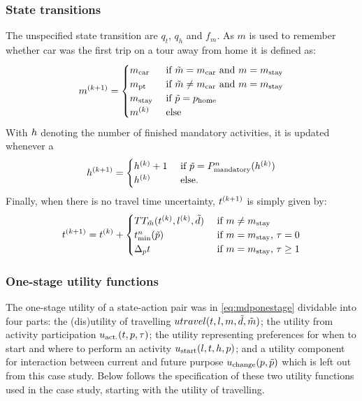 \subsubsection{State transitions}
The unspecified state transition are $q_t$, $q_h$ and $f_m$. As $m$ is used to remember whether car was the first trip on a tour away from home it is defined as:
\begin{equation}
    m\ks{k+1} = 
    \begin{cases}
        \m{car} & \cif \act{m} = \m{car} \text{ and } m=m_\text{stay} \\
        \m{pt}  & \cif \act{m} \neq \m{car} \text{ and } m=m_\text{stay}  \\
        m_\text{stay} & \cif \act{p} = p_{\text{home}} \\
		m\ks{k} & \celse
    \end{cases}
\end{equation}
With $h$ denoting the number of finished mandatory activities, it is updated whenever a 
\begin{equation}
	\amem\ks{k+1} = 
	\begin{cases}
		\amem\ks{k}+1 &\cif \act{p} = P^n_{\text{mandatory}}(\amem\ks{k}) \\
		\amem\ks{k}& \celse.
	\end{cases}
\end{equation}
Finally, when there is no travel time uncertainty, $t^{(k+1)}$ is simply given by:
\begin{equation}
	t\ks{k+1} =t\ks{k} + \begin{cases}
  	\TT_{\act{m}}(t\ks{k},l\ks{k},\act{d}) & \cif m\neq m_\text{stay} \\
  	t_{\text{min}}^n(\act{p}) & \cif m= m_\text{stay} \text{, } \atime = 0  \\
  	\Delta_p t & \cif m= m_\text{stay} \text{, } \atime \geq 1 
	\end{cases}
\end{equation}

\subsubsection{One-stage utility functions}

The one-stage utility of a state-action pair was in \eqref{eq:mdponestage} dividable into four parts: the (dis)utility of travelling $utravel(t,l,m,\tilde{d},\tilde{m})$; the utility from activity participation $u_\text{act.}(t,p,\tau)$; the utility representing preferences for when to start and where to perform an activity $u_\text{start}(l,t,h, p)$; and a utility component for interaction between current and future purpose $u_\text{change}(p,\tilde{p})$ which is left out from this case study. Below follows the specification of these two utility functions used in the case study, starting with the utility of travelling.

